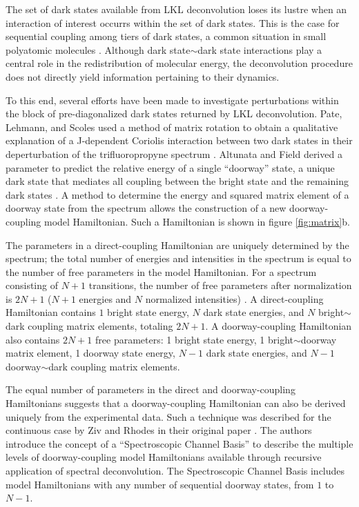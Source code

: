 The set of dark states available from LKL deconvolution loses its
lustre when an interaction of interest occurrs within the set of dark
states.  This is the case for sequential coupling among tiers of dark
states, a common situation in small polyatomic molecules
\cite{tramer05}.  Although dark state$\sim$dark state interactions
play a central role in the redistribution of molecular energy, the
deconvolution procedure does not directly yield information pertaining
to their dynamics.

To this end, several efforts have been made to investigate
perturbations within the block of pre-diagonalized dark states
returned by LKL deconvolution.  Pate, Lehmann, and Scoles used a
method of matrix rotation to obtain a qualitative explanation of a
J-dependent Coriolis interaction between two dark states in their
deperturbation of the trifluoropropyne spectrum \cite{pate91}.
Altunata and Field derived a parameter to predict the relative energy
of a single ``doorway'' state, a unique dark state that mediates all
coupling between the bright state and the remaining dark states
\cite{altunata01}.  A method to determine the energy and squared
matrix element of a doorway state from the spectrum allows the
construction of a new doorway-coupling model Hamiltonian.  Such a
Hamiltonian is shown in figure \ref{fig:matrix}b.

The parameters in a direct-coupling Hamiltonian are uniquely
determined by the spectrum; the total number of energies and
intensities in the spectrum is equal to the number of free parameters
in the model Hamiltonian.  For a spectrum consisting of $N+1$
transitions, the number of free parameters after normalization is
$2N+1$ ($N+1$ energies and $N$ normalized intensities)
\cite{lawrance85}.  A direct-coupling Hamiltonian contains $1$ bright
state energy, $N$ dark state energies, and $N$ bright$\sim$dark
coupling matrix elements, totaling $2N+1$.  A doorway-coupling
Hamiltonian also contains $2N+1$ free parameters: 1 bright state
energy, 1 bright$\sim$doorway matrix element, 1 doorway state energy,
$N-1$ dark state energies, and $N-1$ doorway$\sim$dark coupling matrix
elements.

The equal number of parameters in the direct and doorway-coupling
Hamiltonians suggests that a doorway-coupling Hamiltonian can also be
derived uniquely from the experimental data.  Such a technique was
described for the continuous case by Ziv and Rhodes in their original
paper \cite{ziv76}.  The authors introduce the concept of a
``Spectroscopic Channel Basis'' to describe the multiple levels of
doorway-coupling model Hamiltonians available through recursive
application of spectral deconvolution.  The Spectroscopic Channel
Basis includes model Hamiltonians with any number of sequential
doorway states, from $1$ to $N-1$.

